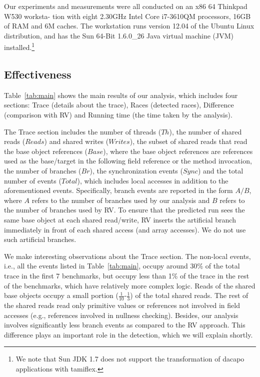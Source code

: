 Our experiments and measurements 
were all conducted on an x86 64 Thinkpad W530 worksta- 
tion with eight 2.30GHz Intel Core i7-3610QM processors, 
16GB of RAM and 6M caches. The workstation runs version 12.04 of the Ubuntu Linux distribution, and has the Sun 
64-Bit 1.6.0\_26 Java virtual machine (JVM) installed.\footnote{We note that Sun JDK 1.7 does not support the transformation of dacapo applications with {\sf tamiflex}.}










\subsection{Effectiveness}
Table~\ref{tab:main} shows the main results of our analysis, which includes four sections: Trace (details about the trace), Races (detected races), Difference (comparison with RV) and Running time (the time taken by the analysis).


The Trace section includes the number of threads ($Th$), the number of shared reads ($Reads$) and shared writes ($Writes$), the subset of shared reads that read the base object references  ($Base$), where the  base object references are references used as the base/target in the following field reference or the method invocation,  the number of branches ($Br$), the synchronization events ($Sync$) and the total number of events ($Total$), which includes local accesses in addition to the aforementioned events. Specifically, branch events are reported in the form $A/B$, where $A$ refers to the number of branches used by our analysis and $B$ refers to the number of branches used by RV. To ensure that the predicted run sees the same base object at each shared read/write, {\sf RV} inserts the artificial branch immediately in front of each shared access (and array accesses). We do not use such artificial branches.


We make interesting observations about the Trace section. The non-local events, i.e., all the events listed in Table~\ref{tab:main}, occupy around 30\% of the total trace in the first 7 benchmarks, but occupy less than 1\% of the trace in the rest of the benchmarks, which have relatively more complex logic. Reads of the shared base objects occupy a small portion ($\frac{1}{10}$-$\frac{1}{3}$) of the total shared reads. The rest of the shared reads read only primitive values or 
references not involved in field accesses (e.g., references involved in nullness checking). Besides, our analysis involves significantly less branch events as compared to the {\sf RV} approach. This difference plays an important role in the detection, which we will explain shortly.


